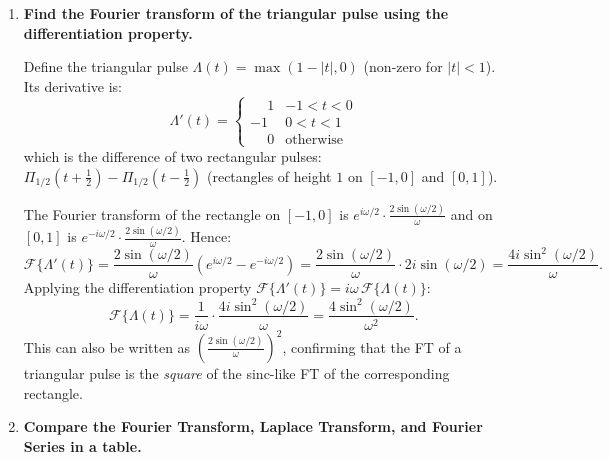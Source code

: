 \documentclass[12pt,a4paper]{article}
\begin{document}
\begin{enumerate}[label=\textbf{Q\arabic*.}, leftmargin=2.5em]
\textbf{Proof:}
\begin{align*}
\mathcal{F}\{f'(t)\}
  &= \int_{-\infty}^{\infty} f'(t)\,e^{-i\omega t}\,dt.
\end{align*}
Integrate by parts with $u = e^{-i\omega t}$ and $dv = f'(t)\,dt$:
\begin{align*}
  &= \left[f(t)\,e^{-i\omega t}\right]_{-\infty}^{\infty}
     - \int_{-\infty}^{\infty} f(t)\,(-i\omega)\,e^{-i\omega t}\,dt.
\end{align*}
Since $f(t) \to 0$ as $|t| \to \infty$, the boundary term vanishes:
\begin{align*}
  &= 0 + i\omega \int_{-\infty}^{\infty} f(t)\,e^{-i\omega t}\,dt
   = i\omega\,F(\omega). \qquad \square
\end{align*}

\item \textbf{Find the Fourier transform of the triangular pulse using the differentiation property.}

Define the triangular pulse $\Lambda(t) = \max(1 - |t|, 0)$ (non-zero for $|t| < 1$).
Its derivative is:
\[
  \Lambda'(t) =
  \begin{cases}
    \phantom{-}1 & -1 < t < 0 \\
    -1 & 0 < t < 1 \\
    \phantom{-}0 & \text{otherwise}
  \end{cases}
\]
which is the difference of two rectangular pulses: $\Pi_{1/2}(t+\tfrac{1}{2}) - \Pi_{1/2}(t-\tfrac{1}{2})$ (rectangles of height $1$ on $[-1,0]$ and $[0,1]$).

The Fourier transform of the rectangle on $[-1,0]$ is $e^{i\omega/2}\cdot\frac{2\sin(\omega/2)}{\omega}$ and on $[0,1]$ is $e^{-i\omega/2}\cdot\frac{2\sin(\omega/2)}{\omega}$.
Hence:
\[
  \mathcal{F}\{\Lambda'(t)\} = \frac{2\sin(\omega/2)}{\omega}\left(e^{i\omega/2} - e^{-i\omega/2}\right)
                              = \frac{2\sin(\omega/2)}{\omega}\cdot 2i\sin(\omega/2)
                              = \frac{4i\sin^2(\omega/2)}{\omega}.
\]
Applying the differentiation property $\mathcal{F}\{\Lambda'(t)\} = i\omega\,\mathcal{F}\{\Lambda(t)\}$:
\[
  \mathcal{F}\{\Lambda(t)\} = \frac{1}{i\omega}\cdot\frac{4i\sin^2(\omega/2)}{\omega}
                            = \frac{4\sin^2(\omega/2)}{\omega^2}.
\]
This can also be written as $\left(\frac{2\sin(\omega/2)}{\omega}\right)^2$, confirming that the
FT of a triangular pulse is the \emph{square} of the sinc-like FT of the corresponding rectangle.

\item \textbf{Compare the Fourier Transform, Laplace Transform, and Fourier Series in a table.}


\end{enumerate}
\end{document}
